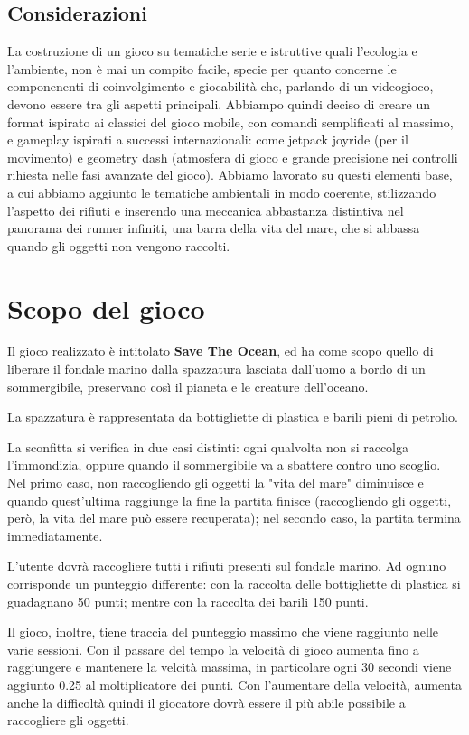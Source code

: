 \documentclass[15pt]{article}
\begin{document}
\subsection{Considerazioni}
La costruzione di un gioco su tematiche serie e istruttive quali l'ecologia e l'ambiente,
non è mai un compito facile, 
specie per quanto concerne le componenenti di coinvolgimento e giocabilità che, parlando di un videogioco, 
devono essere tra gli aspetti principali. 
Abbiampo quindi deciso di creare un format ispirato ai classici del gioco mobile,
con comandi semplificati al massimo,
e gameplay ispirati a successi internazionali:
come jetpack joyride (per il movimento) e geometry dash
(atmosfera di gioco e grande precisione nei controlli rihiesta nelle fasi avanzate del gioco). 
Abbiamo lavorato su questi elementi base, a cui abbiamo aggiunto le tematiche ambientali in modo coerente, 
stilizzando l'aspetto dei rifiuti e inserendo una meccanica abbastanza distintiva nel panorama dei runner infiniti,
una barra della vita del mare, che si abbassa quando gli oggetti non vengono raccolti.

\section{Scopo del gioco}
Il gioco realizzato è intitolato \textbf{Save The Ocean}, 
ed ha come scopo quello di liberare il fondale marino dalla spazzatura lasciata dall'uomo a bordo di un sommergibile, 
preservano così il pianeta e le creature dell'oceano.

La spazzatura è rappresentata da bottigliette di plastica e barili pieni di petrolio.

La sconfitta si verifica in due casi distinti:
ogni qualvolta non si raccolga l'immondizia, 
oppure quando il sommergibile va a sbattere contro uno scoglio. 
Nel primo caso, non raccogliendo gli oggetti la "vita del mare" diminuisce e quando quest'ultima raggiunge la fine la partita finisce
(raccogliendo gli oggetti, però, la vita del mare può essere recuperata); 
nel secondo caso, la partita termina immediatamente.

L'utente dovrà raccogliere tutti i rifiuti presenti sul fondale marino. 
Ad ognuno corrisponde un punteggio differente: 
con la raccolta delle bottigliette di plastica si guadagnano 50 punti;
mentre con la raccolta dei barili 150 punti. 

Il gioco, inoltre, 
tiene traccia del punteggio massimo che viene raggiunto nelle varie sessioni.
Con il passare del tempo la velocità di gioco aumenta
fino a raggiungere e mantenere la velcità massima, 
in particolare ogni 30 secondi viene aggiunto 0.25 al moltiplicatore dei punti. 
Con l'aumentare della velocità,
aumenta anche la difficoltà quindi il giocatore dovrà essere il più abile possibile a raccogliere gli oggetti. 
\end{document}
